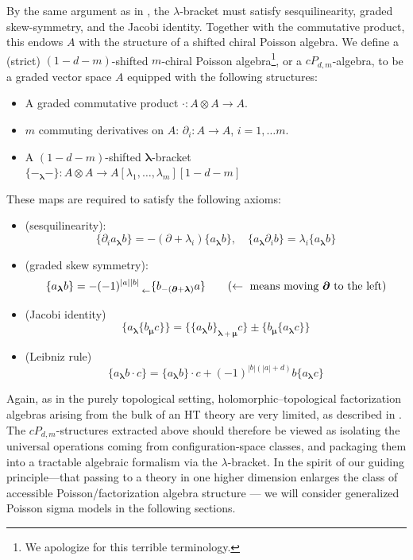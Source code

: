 \documentclass[11pt]{article}
\numberwithin{equation}{section}
\begin{document}
By the same argument as in \cite{Oh:2019mcg}, the $\lambda$-bracket must satisfy sesquilinearity, graded skew-symmetry, and the Jacobi identity. Together with the commutative product, this endows $A$ with the structure of a shifted chiral Poisson algebra. We define a (strict) $(1-d-m)$-shifted $m$-chiral Poisson algebra\footnote{We apologize for this terrible terminology.}, or a $cP_{d,m}$-algebra, to be a graded vector space $A$ equipped with the following structures:
 \begin{itemize}
 	\item A graded commutative product $\cdot: A\otimes A\to A$.
 	\item $m$ commuting derivatives on $A$: $\partial_i:A\to A$, $i = 1,\dots m$.
 	\item  A $(1-d-m)$-shifted $\boldsymbol{\lambda}$-bracket $\{-_{\boldsymbol{\lambda}}-\}: A\otimes A\to A[\lambda_1,\dots,\lambda_m][1-d-m]$
 \end{itemize}
 These maps are required to satisfy the following axioms:
 \begin{itemize}
 	\item (sesquilinearity):
 	$$
 	\{\partial_ia_{\boldsymbol{\lambda}}b\} = -(\partial+\lambda_i)\{a_{\boldsymbol{\lambda}}b\},\quad \{a_{\boldsymbol{\lambda}}\partial_ib\} = \lambda_i  \{a_{\boldsymbol{\lambda}}b\}
 	$$
 	\item (graded skew symmetry):
 	$$
 	\{a_{\boldsymbol{\lambda}}b\} = - (-1)^{|a||b|}\prescript{}{\leftarrow}\{b_{-(\boldsymbol{\partial} + \boldsymbol{\lambda})}a\} \quad \quad (\leftarrow\text{ means moving $\boldsymbol{\partial}$ to the left})
 	$$
 	\item (Jacobi identity)
 	$$
 	\{a_{\boldsymbol{\lambda}}\{b_{\boldsymbol{\mu}}c\}\} = \{\{a_{\boldsymbol{\lambda}}b\}_{\boldsymbol{\lambda} + \boldsymbol{\mu}}c\} \pm\{b_{\boldsymbol{\mu}}\{a_{\boldsymbol{\lambda}}c\}\}
 	$$
 	\item (Leibniz rule)
 	$$
		\{a_{\boldsymbol{\lambda}}b\cdot c\} = \{a_{\boldsymbol{\lambda}}b\}\cdot c + (-1)^{|b|(|a| + d)}b\{a_{\boldsymbol{\lambda}}c\} 
 	$$
 \end{itemize}

Again, as in the purely topological setting, holomorphic--topological factorization algebras arising from the bulk of an HT theory are very limited, as described in \cite{Gaiotto:2024gii}. The $cP_{d,m}$-structures extracted above should therefore be viewed as isolating the universal operations coming from configuration-space classes, and packaging them into a tractable algebraic formalism via the $\lambda$-bracket. In the spirit of our guiding principle—that passing to a theory in one higher dimension enlarges the class of accessible Poisson/factorization algebra structure — we will consider generalized Poisson sigma models in the following sections.
\end{document}
